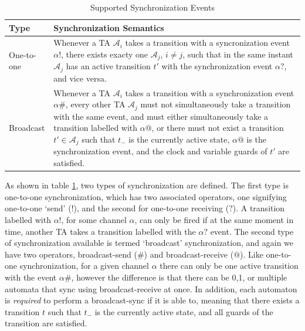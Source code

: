\documentclass[a4paper,12pt]{article}
\begin{document}
\begin{table}
  \centering
  \begin{tabular}{l p{}}
    \textbf{Type} & \textbf{Synchronization Semantics} \\
    \midrule
    One-to-one & Whenever a TA $\mathcal{A}_{i}$ takes a transition with a
                 syncronization event $\alpha{!}$, there exists exacty one
                 $\mathcal{A}_{j}$, $i\neq j$, such that in the same instant
                 $\mathcal{A}_{j}$ has an active transition $t'$ with the
                 synchronization event $\alpha{?}$, and vice versa. \\
    \midrule
    Broadcast &  Whenever a TA $\mathcal{A}_{i}$ takes a transition with a
                synchronization event $\alpha\#$, every other TA
                $\mathcal{A}_{j}$ must not simultaneously take a transition with
                the same event, and must either simultaneously take a transition
                labelled with $\alpha@$, or there must not exist a transition
                $t' \in \mathcal{A}_{j}$ such that $t_{-}$ is the currently
                active state, $\alpha@$ is the synchronization event, and the
                clock and variable guards of $t'$ are satisfied.
    \\
    \midrule
  \end{tabular}
  \caption{Supported Synchronization Events}
  \label{table:sync-def}
\end{table}

As shown in table \ref{table:sync-def}, two types of synchronization are
defined. The first type is one-to-one synchronization, which has two associated
operators, one signifying one-to-one `send' (${!}$), and the second for
one-to-one receiving (${?}$). A transition labelled with $\alpha{!}$, for some
channel $\alpha$, can only be fired if at the same moment in time, another TA
takes a transition labelled with the $\alpha{?}$ event. The second type of
synchronization available is termed `broadcast' synchronization, and again we
have two operators, broadcast-send ($\#$) and broadcast-receive (${@}$). Like
one-to-one synchronization, for a given channel $\alpha$ there can only be one
active transition with the event $\alpha\#$, however the difference is that
there can be 0,1, or multiple automata that sync using broadcast-receive at
once. In addition, each automaton is \emph{required} to perform a broadcast-sync
if it is able to, meaning that there exists a transition $t$ such that $t_{-}$
is the currently active state, and all guards of the transition are satisfied.
\end{document}
